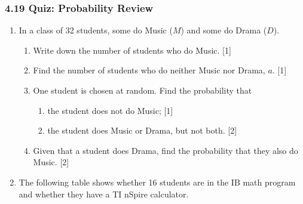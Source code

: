 \documentclass[12pt, twoside]{article}
\begin{document}
\subsubsection*{4.19 Quiz: Probability Review}

\begin{enumerate}[itemsep=0.1cm]

\item In a class of 32 students, some do Music ($M$) and some do Drama ($D$).

\begin{center}
\vspace{-0.3cm}
\vspace{-0.3cm}
\end{center}

\begin{enumerate}[itemsep=0.1cm]
  \item Write down the number of students who do Music. \hfill [1]
  \item Find the number of students who do neither Music nor Drama, $a$. \hfill [1]
  \item One student is chosen at random. Find the probability that
  \begin{enumerate}[label=(\roman*), itemsep=0.1cm]
    \item the student does not do Music; \hfill [1]
    \item the student does Music or Drama, but not both. \hfill [2]
  \end{enumerate}
  \item Given that a student does Drama, find the probability that they also do Music. \hfill [2]
\end{enumerate}


\newpage

\item The following table shows whether 16 students are in the IB math program
and whether they have a TI nSpire calculator.


\end{enumerate}
\end{document}
